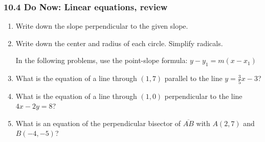 \documentclass[12pt, twoside]{article}
\begin{document}
\subsubsection*{10.4 Do Now: Linear equations, review}
  \begin{enumerate}

  \item Write down the slope perpendicular to the given slope. \vspace{0.5cm}
  \begin{enumerate}
  \end{enumerate} \vspace{1cm}

  \item Write down the center and radius of each circle. Simplify radicals.
  \begin{enumerate}
  \end{enumerate}  \vspace{2cm}

  In the following problems, use the point-slope formula: $y-y_1=m (x-x_1)$
  \item What is the equation of a line through $(1,7)$ parallel to the line $y=\frac{3}{5}x-3$?  \vspace{2cm}
  \item What is the equation of a line through $(1,0)$ perpendicular to the line $4x-2y=8$?  \vspace{3cm}
  
  \item What is an equation of the perpendicular bisector of $\overline{AB}$ with $A(2,7)$ and $B(-4,-5)$? \vspace{2cm}


\end{enumerate}
\end{document}
